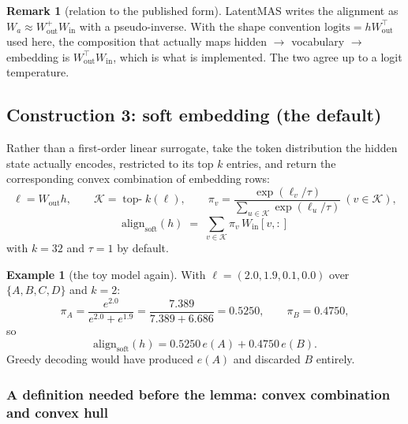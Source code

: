\documentclass[11pt]{article}
\theoremstyle{definition}
\newtheorem{remark}[theorem]{Remark}
\newtheorem{example}[theorem]{Example}
\begin{document}
\begin{remark}[relation to the published form]
LatentMAS writes the alignment as $W_a \approx W_{\mathrm{out}}^{+}W_{\mathrm{in}}$ with a pseudo-inverse. With the shape convention $\mathrm{logits} = hW_{\mathrm{out}}^\top$ used here, the composition that actually maps hidden $\to$ vocabulary $\to$ embedding is $W_{\mathrm{out}}^{\top}W_{\mathrm{in}}$, which is what is implemented. The two agree up to a logit temperature.
\end{remark}

\subsection{Construction 3: soft embedding (the default)}
Rather than a first-order linear surrogate, take the token distribution the hidden state actually encodes, restricted to its top $k$ entries, and return the corresponding convex combination of embedding rows:
\[
\ell = W_{\mathrm{out}}h,\qquad
\mathcal{K} = \operatorname{top-}k(\ell),\qquad
\pi_v = \frac{\exp(\ell_v/\tau)}{\sum_{u\in\mathcal{K}}\exp(\ell_u/\tau)}\ (v \in \mathcal{K}),
\]
\[
\boxed{\ \mathrm{align}_{\mathrm{soft}}(h) \;=\; \sum_{v\in\mathcal{K}} \pi_v\, W_{\mathrm{in}}[v,:]\ }
\tag{4.3}
\]
with $k=32$ and $\tau=1$ by default.

\begin{center}
\end{center}

\begin{example}[the toy model again]
With $\ell = (2.0, 1.9, 0.1, 0.0)$ over $\{A,B,C,D\}$ and $k=2$:
\[
\pi_A = \frac{e^{2.0}}{e^{2.0}+e^{1.9}} = \frac{7.389}{7.389+6.686}=0.5250,
\qquad \pi_B = 0.4750,
\]
so
\[
\mathrm{align}_{\mathrm{soft}}(h) = 0.5250\,e(A) + 0.4750\,e(B).
\]
Greedy decoding would have produced $e(A)$ and discarded $B$ entirely.
\end{example}

\subsubsection*{A definition needed before the lemma: convex combination and convex hull}
\end{document}
